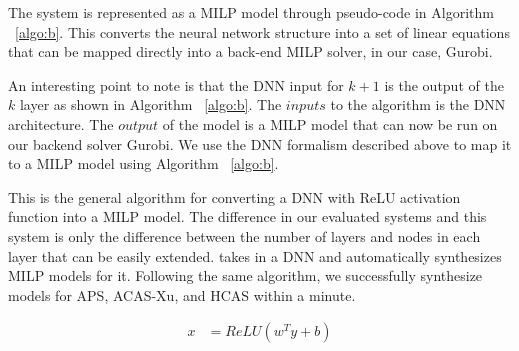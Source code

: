 The system is represented as a MILP model through pseudo-code in Algorithm ~\ref{algo:b}. 
This converts the neural network structure into a set of linear equations that can be mapped directly into a back-end MILP solver, in our case, Gurobi. 

An interesting point to note is that the DNN input for $k+1$ is the output of the $k$ layer as shown in Algorithm  ~\ref{algo:b}. 
The $inputs$ to the algorithm is the \ac{DNN} architecture. 
The $output$ of the model is a \ac{MILP} model that can now be run on our backend solver Gurobi. 
We use the \ac{DNN} formalism described above to map it to a \ac{MILP} model using Algorithm ~\ref{algo:b}.

This is the general algorithm for converting a \ac{DNN} with ReLU activation function into a \ac{MILP} model. 
The difference in our evaluated systems and this system is only the difference between the number of layers and nodes in each layer that can be easily extended.
\tool  takes in a \ac{DNN} and automatically synthesizes \ac{MILP} models for it. 
Following the same algorithm, we successfully synthesize models for \ac{APS}, \ac{ACAS-Xu}, and \ac{HCAS} within a minute. 

\begin{equation}
\label{10}
\begin{aligned}
x &= ReLU(w^Ty + b) \\
\end{aligned}
\end{equation}

